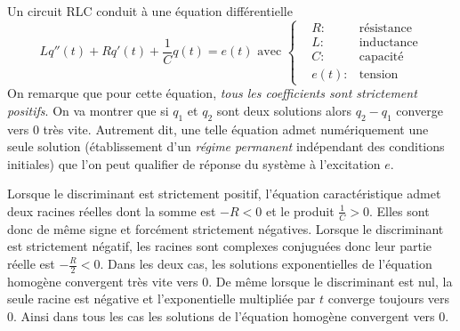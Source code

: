Un circuit RLC conduit à une équation différentielle 
\begin{displaymath}
 Lq''(t)+Rq'(t)+\frac{1}{C}q(t)= e(t) \text{ avec }
\left\lbrace  
\begin{aligned}
 &R :&\text{résistance}\\ &L :& \text{inductance} \\ &C :&\text{capacité} \\ &e(t) :&\text{tension}
\end{aligned}
\right. 
\end{displaymath}
On remarque que pour cette équation, \emph{tous les coefficients sont strictement positifs}. On va montrer que si $q_1$ et $q_2$ sont deux solutions alors $q_2 -q_1$ converge vers $0$ très vite. Autrement dit, une telle équation admet numériquement une seule solution  (établissement d'un \emph{régime permanent} indépendant des conditions initiales) que l'on peut qualifier de réponse du système à l'excitation $e$.
\begin{demo}
Lorsque le discriminant est strictement positif, l'équation caractéristique admet deux racines réelles dont la somme est $-R<0$ et le produit $\frac{1}{C}>0$. Elles sont donc de même signe et forcément strictement négatives.\newline
Lorsque le discriminant est strictement négatif, les racines sont complexes conjuguées donc leur partie réelle est $-\frac{R}{2}<0$.\newline
Dans les deux cas, les solutions exponentielles de l'équation homogène convergent très vite vers $0$. De même lorsque le discriminant est nul, la seule racine est négative et l'exponentielle multipliée par $t$ converge toujours vers $0$. Ainsi dans tous les cas les solutions de l'équation homogène convergent vers $0$.  
\end{demo}


